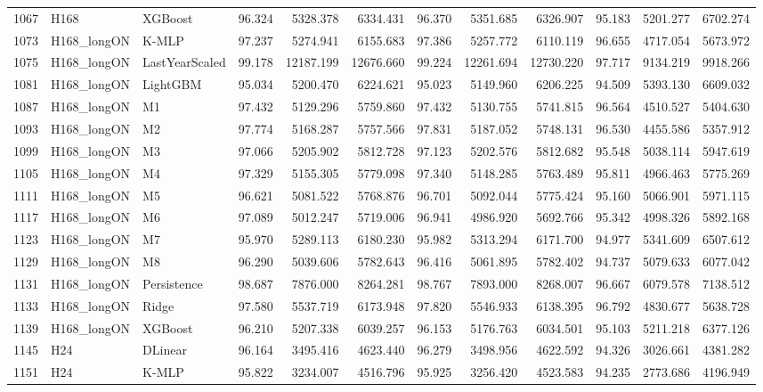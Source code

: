 \begin{tabular}{lllrrrrrrrrr}
1067 & H168 & XGBoost & 96.324 & 5328.378 & 6334.431 & 96.370 & 5351.685 & 6326.907 & 95.183 & 5201.277 & 6702.274 \\
1073 & H168_longON & K-MLP & 97.237 & 5274.941 & 6155.683 & 97.386 & 5257.772 & 6110.119 & 96.655 & 4717.054 & 5673.972 \\
1075 & H168_longON & LastYearScaled & 99.178 & 12187.199 & 12676.660 & 99.224 & 12261.694 & 12730.220 & 97.717 & 9134.219 & 9918.266 \\
1081 & H168_longON & LightGBM & 95.034 & 5200.470 & 6224.621 & 95.023 & 5149.960 & 6206.225 & 94.509 & 5393.130 & 6609.032 \\
1087 & H168_longON & M1 & 97.432 & 5129.296 & 5759.860 & 97.432 & 5130.755 & 5741.815 & 96.564 & 4510.527 & 5404.630 \\
1093 & H168_longON & M2 & 97.774 & 5168.287 & 5757.566 & 97.831 & 5187.052 & 5748.131 & 96.530 & 4455.586 & 5357.912 \\
1099 & H168_longON & M3 & 97.066 & 5205.902 & 5812.728 & 97.123 & 5202.576 & 5812.682 & 95.548 & 5038.114 & 5947.619 \\
1105 & H168_longON & M4 & 97.329 & 5155.305 & 5779.098 & 97.340 & 5148.285 & 5763.489 & 95.811 & 4966.463 & 5775.269 \\
1111 & H168_longON & M5 & 96.621 & 5081.522 & 5768.876 & 96.701 & 5092.044 & 5775.424 & 95.160 & 5066.901 & 5971.115 \\
1117 & H168_longON & M6 & 97.089 & 5012.247 & 5719.006 & 96.941 & 4986.920 & 5692.766 & 95.342 & 4998.326 & 5892.168 \\
1123 & H168_longON & M7 & 95.970 & 5289.113 & 6180.230 & 95.982 & 5313.294 & 6171.700 & 94.977 & 5341.609 & 6507.612 \\
1129 & H168_longON & M8 & 96.290 & 5039.606 & 5782.643 & 96.416 & 5061.895 & 5782.402 & 94.737 & 5079.633 & 6077.042 \\
1131 & H168_longON & Persistence & 98.687 & 7876.000 & 8264.281 & 98.767 & 7893.000 & 8268.007 & 96.667 & 6079.578 & 7138.512 \\
1133 & H168_longON & Ridge & 97.580 & 5537.719 & 6173.948 & 97.820 & 5546.933 & 6138.395 & 96.792 & 4830.677 & 5638.728 \\
1139 & H168_longON & XGBoost & 96.210 & 5207.338 & 6039.257 & 96.153 & 5176.763 & 6034.501 & 95.103 & 5211.218 & 6377.126 \\
1145 & H24 & DLinear & 96.164 & 3495.416 & 4623.440 & 96.279 & 3498.956 & 4622.592 & 94.326 & 3026.661 & 4381.282 \\
1151 & H24 & K-MLP & 95.822 & 3234.007 & 4516.796 & 95.925 & 3256.420 & 4523.583 & 94.235 & 2773.686 & 4196.949 \\

\end{tabular}
